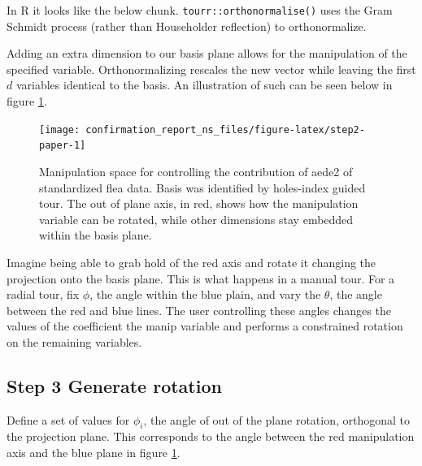 \documentclass{monashthesis}
\begin{document}
In R it looks like the below chunk. \texttt{tourr::orthonormalise()}
uses the Gram Schmidt process (rather than Householder reflection) to
orthonormalize.

\begin{Shaded}
\begin{Highlighting}[]
\StringTok{ }\NormalTok{(}\NormalTok{, } 
\StringTok{ }
\StringTok{ }\OperatorTok{::}\NormalTok{(}
\end{Highlighting}
\end{Shaded}

Adding an extra dimension to our basis plane allows for the manipulation
of the specified variable. Orthonormalizing rescales the new vector
while leaving the first \(d\) variables identical to the basis. An
illustration of such can be seen below in figure \ref{fig:step2-paper}.

\begin{figure}

{\centering \texttt{[image: confirmation\_report\_ns\_files/figure-latex/step2-paper-1]} 

}

\caption{Manipulation space for controlling the contribution of aede2 of standardized flea data. Basis was identified by holes-index guided tour. The out of plane axis, in red, shows how the manipulation variable can be rotated, while other dimensions stay embedded within the basis plane.}\label{fig:step2-paper}
\end{figure}

Imagine being able to grab hold of the red axis and rotate it changing
the projection onto the basis plane. This is what happens in a manual
tour. For a radial tour, fix \(\phi\), the angle within the blue plain,
and vary the \(\theta\), the angle between the red and blue lines. The
user controlling these angles changes the values of the coefficient the
manip variable and performs a constrained rotation on the remaining
variables.

\subsection{Step 3 Generate rotation}\label{step-3-generate-rotation-1}

Define a set of values for \(\phi_i\), the angle of out of the plane
rotation, orthogonal to the projection plane. This corresponds to the
angle between the red manipulation axis and the blue plane in figure
\ref{fig:step2-paper}.
\end{document}
